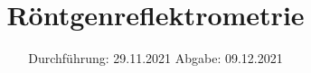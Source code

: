 
\setlength\parindent{0pt}
\subject{V44}
\title{Röntgenreflektrometrie}
\date{%
  Durchführung: 29.11.2021
  \hspace{3em}
  Abgabe: 09.12.2021 \\
}



\maketitle
\thispagestyle{empty}
\tableofcontents
\newpage







\newpage
\nocite{*}
\printbibliography
\appendix


